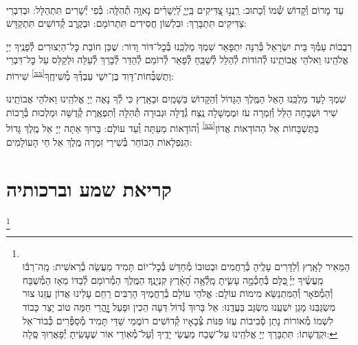 \documentclass[twoside, openany, parskip=half, 11pt]{book}
\begin{document}
\\
עַד מָרוֹם וְ֯קָדוֹשׁ שְׁ֯מוֹ וְ֯כָתוּב: רַֽנֲנ֣וּ צַ֭דִּיקִים בַּֽיְיָ֑ לַ֝יְשָׁרִ֗ים נָאוָ֥ה תְ֯הִלָּֽה: בְּ֯פִי יְ֯שָׁרִים תִּתְהַלָּל: וּבְדִבְרֵי צַדִּיקִים תִּתְבָּרַךְ: וּבִלְשׁוֹן חֲסִידִים תִּתְרוֹמָם: וּבְקֶֽרֶב קְ֯דוֹשִׁים תִּתְקַדָּשׁ:

רִבֲבוֹת עַמְּ֯ךָ בֵּית יִשְׂרָאֵל בְּ֯רִנָּה יִתְפָּאַר שִׁמְךָ מַלְכֵּֽנוּ בְּ֯כׇל־דּוֹר וָדוֹר: שֶׁכֵּן חוֹבַת כׇּל־הַיְצוּרִים לְ֯פָנֶֽיךָ יְיָ אֱלֹהֵֽינוּ וֵאלֹהֵי אֲבוֹתֵֽינוּ לְ֯הוֹדוֹת לְ֯הַלֵּל לְ֯שַׁבֵּֽחַ לְ֯פָאֵר לְ֯רוֹמֵם לְ֯הַדֵּר לְ֯בָרֵךְ לְ֯עַלֵּה וּלְקַלֵּס עַל כׇּל־דִּבְרֵי שִׁירוֹת \textsuperscript{\ref{xx}}וְתֻשְׁבְּ֯חוֹת־דָּוִד בֶּן־יִשַׁי עַבְדְּ֯ךָ מְ֯שִׁיחֶֽךָ:


שִׁמְךָ לָעַד מַלְכֵּֽנוּ הָאֵל הַמֶּֽלֶךְ הַגָּדוֹל וְ֯הַקָּדוֹשׁ בַּשָׁמַֽיִם וּבָאָֽרֶץ כִּי לְ֯ךָ נָאֶה יְיָ אֱלֹהֵֽינוּ וֵאלֹהֵי אֲבוֹתֵֽינוּ שִׁיר וּשְׁבָחָה הַלֵּל וְ֯זִמְרָה עֹז וּמֶמְשָׁלָה נֶֽצַח גְּ֯דֻלָּה וּגְבוּרָה תְּ֯הִלָּה וְ֯תִפְאֶֽרֶת קְ֯דֻשָּׁה וּמַלְכוּת בְּ֯רָכוֹת וְ֯הוֹדָאוֹת מֵעַתָּה וְ֯עַד עוֹלָם:
בָּרוּךְ אַתָּה יְיָ אֵל מֶֽלֶךְ גָּדוֹל \textsuperscript{\ref{xx}}בַּתֻּשְׁבָּחוֹת אֵל הַהוֹדָאוֹת אֲדוֹן הַנִּפְלָאוֹת הַבּוֹחֵר בְּ֯שִׁירֵי זִמְרָה מֶֽלֶךְ אֵל חַי הָעוֹלָמִים:
\mimaamakim
\halfkaddish

\section*{ קריאת שמע וברכותיה }

\barachu


\footnote{\\
הַמֵּאִיר לָאָֽרֶץ וְ֯לַדָּרִים עָלֶֽיהָ בְּ֯רַחֲמִים וּבְטוּבוֹ מְ֯חַדֵּשׁ בְּ֯כׇל־יוֹם תָּמִיד מַעֲשֵׂה בְ֯רֵאשִׁית:
מָֽה־רַבּ֬וּ מַֽעֲשֶׂ֨יךָ יְיָ֗ ֖כֻּלָּם בְּ֯חָכְ֯מָ֣ה עָשִׂ֑יתָ מָֽלְ֯אָ֥ה הָ֝אָ֗רֶץ קִנְיָנֶֽךָ׃ הַמֶּֽלֶךְ הַמְ֯רוֹמָם לְ֯בַדּוֹ מֵאָז הַמְ֯שֻׁבָּח וְ֯הַמְ֯פֹאָר וְ֯הַמִּתְנַשֵּׂא מִימוֹת עוֹלָם: אֱלֹהֵי עוֹלָם בְּ֯רַחֲמֶיךָ הָרַבִּים רַחֵם עָלֵינוּ אֲדוֹן עֻזֵּֽנוּ צוּר מִשְׂגַּבֵּנוּ מָגֵן יִשְׁעֵֽנוּ מִשְׂגָּב בַּעֲדֵֽנוּ: אֵל בָּרוּךְ גְּ֯דוֹל דֵּעָה הֵכִין וּפָעַל זׇׇׇׇׇׇׇׇהֳרֵי חַמָּה טוֹב יָצַר כָּבוֹד לִשְׁמוֹ מְ֯אוֹרוֹת נָתַן סְ֯בִיבוֹת עֻזּוֹ פִּנּוֹת צְ֯בָאָיו קְ֯דוֹשִׁים רוֹמֲמֵי שַׁדַּי תָּמִיד מְ֯סַפְּ֯רִים כְּ֯בוֹד־אֵל וּקְדֻשָׁתוֹ: תִּתְבָּרַךְ יְיָ אֱלֹהֵֽינוּ עַל־שֶׁבַח מַעֲשֵׂי יָדֶֽיךָ וְ֯עַל־מְ֯אֽוֹרֵי אוֹר שֶׁעָשִֽׂיתָ יְ֯פָאֲרֽוּךָ סֶּֽלָה:
}
\end{document}
